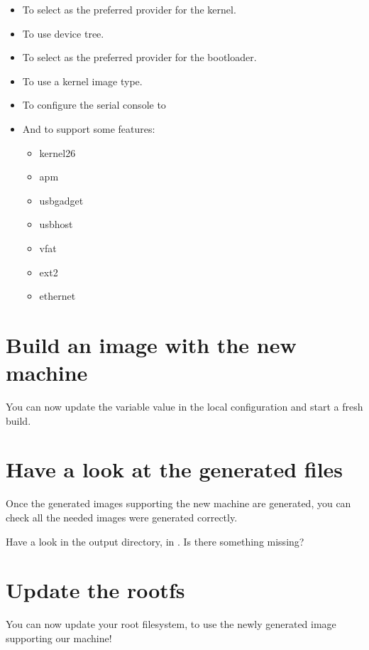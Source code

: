 \begin{itemize}
  \item To select  as the preferred provider
    for the kernel.
  \item To use  device tree.
  \item To select  as the preferred provider
    for the bootloader.
  \item To use a  kernel image type.
  \item To configure the serial console to 
  \item And to support some features:
    \begin{itemize}
      \item kernel26
      \item apm
      \item usbgadget
      \item usbhost
      \item vfat
      \item ext2
      \item ethernet
    \end{itemize}
\end{itemize}

\section{Build an image with the new machine}

You can now update the  variable value in the local configuration
and start a fresh build.

\section{Have a look at the generated files}

Once the generated images supporting the new  machine are
generated, you can check all the needed images were generated
correctly.

Have a look in the output directory, in
. Is there something
missing?

\section{Update the rootfs}

You can now update your root filesystem, to use the newly
generated image supporting our  machine!
